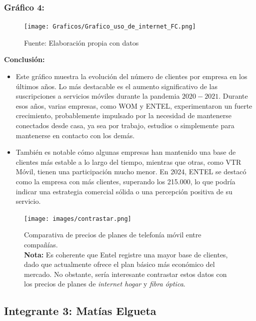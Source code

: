 \documentclass[12pt, a4paper]{article}
\begin{document}
\subsubsection*{Gráfico 4: }
\begin{figure}[H]
    \centering
    \texttt{[image: Graficos/Grafico\_uso\_de\_internet\_FC.png]}
    \caption[4]{Fuente: Elaboración propia con datos}

\end{figure}


\textbf{Conclusión:}  
\begin{itemize}
    \item Este gráfico muestra la evolución del número de clientes por empresa en los últimos años. Lo más destacable es el aumento significativo de las suscripciones a servicios móviles durante la pandemia \(2020-2021\).
    Durante esos años, varias empresas, como WOM y ENTEL, experimentaron un fuerte crecimiento, probablemente impulsado por la necesidad de mantenerse conectados desde casa, ya sea por trabajo, estudios o simplemente para mantenerse en contacto con los demás.
    \item También es notable cómo algunas empresas han mantenido una base de clientes más estable a lo largo del tiempo, mientras que otras, como VTR Móvil, tienen una participación mucho menor. En 2024, ENTEL se destacó como la empresa con más clientes, superando los 215.000, lo que podría indicar una estrategia comercial sólida o una percepción positiva de su servicio.

\end{itemize}

\begin{figure}[H]
    \centering
    \texttt{[image: images/contrastar.png]}
    \caption[Relación precio-plan]{
        Comparativa de precios de planes de telefonía móvil entre compañías. \\
        \textbf{Nota:} Es coherente que Entel registre una mayor base de clientes, dado que actualmente ofrece el plan básico más económico del mercado. No obstante, sería interesante contrastar estos datos con los precios de planes de \textit{internet hogar} y \textit{fibra óptica}.%
    }
    \label{fig:precios_telefonia}
    
   
\end{figure}
\subsection*{Integrante 3: Matías Elgueta}
\end{document}
